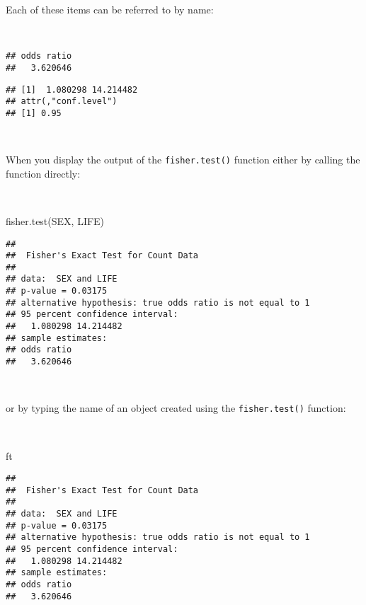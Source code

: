\documentclass[
  12pt,
  a4paper]{book}
\newenvironment{Shaded}{\begin{snugshade}}{\end{snugshade}}
\newcommand{\FunctionTok}[1]{\textcolor[rgb]{0.00,0.00,0.00}{#1}}
\newcommand{\NormalTok}[1]{#1}
\newcommand{\SpecialCharTok}[1]{\textcolor[rgb]{0.00,0.00,0.00}{#1}}
\begin{document}
Each of these items can be referred to by name:

~

\begin{Shaded}
\end{Shaded}

\begin{verbatim}
## odds ratio 
##   3.620646
\end{verbatim}

\begin{verbatim}
## [1]  1.080298 14.214482
## attr(,"conf.level")
## [1] 0.95
\end{verbatim}

~

When you display the output of the \texttt{fisher.test()} function either by calling the function directly:

~

\begin{Shaded}
\begin{Highlighting}[]
\FunctionTok{fisher.test}\NormalTok{(SEX, LIFE)}
\end{Highlighting}
\end{Shaded}

\begin{verbatim}
## 
##  Fisher's Exact Test for Count Data
## 
## data:  SEX and LIFE
## p-value = 0.03175
## alternative hypothesis: true odds ratio is not equal to 1
## 95 percent confidence interval:
##   1.080298 14.214482
## sample estimates:
## odds ratio 
##   3.620646
\end{verbatim}

~

or by typing the name of an object created using the \texttt{fisher.test()} function:

~

\begin{Shaded}
\begin{Highlighting}[]
\NormalTok{ft}
\end{Highlighting}
\end{Shaded}

\begin{verbatim}
## 
##  Fisher's Exact Test for Count Data
## 
## data:  SEX and LIFE
## p-value = 0.03175
## alternative hypothesis: true odds ratio is not equal to 1
## 95 percent confidence interval:
##   1.080298 14.214482
## sample estimates:
## odds ratio 
##   3.620646
\end{verbatim}
\end{document}
